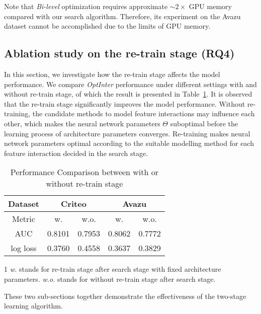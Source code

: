 \documentclass[conference]{IEEEtran}
\begin{document}
Note that \emph{Bi-level} optimization requires approximate $\sim 2\times$ GPU memory compared with our search algorithm. Therefore, its experiment on the Avazu dataset cannot be accomplished due to the limits of GPU memory.

\subsection{Ablation study on the re-train stage (RQ4)}

In this section, we investigate how the re-train stage affects the model performance. 
We compare \textit{OptInter} performance under different settings with and without re-train stage, of which the result is presented in Table~\ref{Table:retrain}. 
It is observed that the re-train stage significantly improves the model performance. 
Without re-training, the candidate methods to model feature interactions may influence each other, which makes the neural network parameters $\Theta$ suboptimal before the learning process of architecture parameters converges.
Re-training makes neural network parameters optimal according to the suitable modelling method for each feature interaction decided in the search stage.

\begin{table}[!htbp]
    \renewcommand\arraystretch{1.05}
	\centering
	\caption{Performance Comparison between with or without re-train stage}
	\begin{tabular}{c|cc|cc}
		\hline
		  Dataset & \multicolumn{2}{c|}{Criteo} & \multicolumn{2}{c}{Avazu} \\
		\hline
		  Metric & w. & w.o. & w. & w.o. \\
		\hline
		  AUC         & 0.8101 & 0.7953 & 0.8062 & 0.7772 \\
		  log loss    & 0.3760 & 0.4558 & 0.3637 & 0.3829 \\
		\hline
	\end{tabular}
	\begin{tablenotes}
    \footnotesize
    \item[1] \textit{w.} stands for re-train stage after search stage with fixed architecture parameters. \textit{w.o.} stands for without re-train stage after search stage.
    \end{tablenotes}
	\label{Table:retrain}
\end{table}

These two sub-sections together demonstrate the effectiveness of the two-stage learning algorithm.
\end{document}
